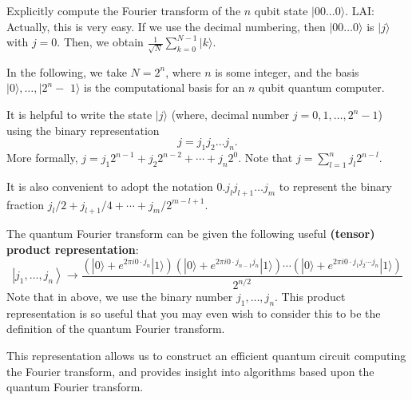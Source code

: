 
\begin{exercise}
    Explicitly compute the Fourier transform of the $n$ qubit state $|00 \ldots 0\rangle$. LAI: Actually, this is very easy. If we use the decimal numbering, then $|00 \ldots 0\rangle$ is $|j\rangle$ with $j=0$. Then, we obtain $\frac{1}{\sqrt{N}} \sum_{k=0}^{N-1}|k\rangle$.
\end{exercise}

In the following, we take $N=2^{n}$, where $n$ is some integer, and the basis $|0\rangle, \ldots, \mid 2^{n}-$ $1\rangle$ is the computational basis for an $n$ qubit quantum computer. 

It is helpful to write the state $|j\rangle$ (where, decimal number $j=0,1,\dots,2^n-1$) using the binary representation 
\begin{equation}
    j=j_{1} j_{2} \ldots j_{n}.
\end{equation}
More formally, $j=j_{1} 2^{n-1}+j_{2} 2^{n-2}+\cdots+j_{n} 2^{0}$. Note that $j=\sum_{l=1}^n j_l 2^{n-l}.$

It is also convenient to adopt the notation $0.j_{l} j_{l+1} \ldots j_{m}$ to represent the  binary fraction $j_{l} / 2+j_{l+1} / 4+\cdots+j_{m} / 2^{m-l+1}.$ 


\begin{theorem}
    The quantum Fourier transform can be given the following useful \textbf{(tensor) product representation}:
\begin{equation}
    \left|j_{1}, \ldots, j_{n}\right\rangle \rightarrow \frac{\left(|0\rangle+e^{2 \pi i 0 \cdot j_{n}}|1\rangle\right)\left(|0\rangle+e^{2 \pi i 0 \cdot j_{n-1} j_{n}}|1\rangle\right) \cdots\left(|0\rangle+e^{2 \pi i 0 \cdot j_{1} j_{2} \cdots j_{n}}|1\rangle\right)}{2^{n / 2}} \tag{5.4}
\end{equation}
Note that in above, we use the binary number $j_{1}, \ldots, j_{n}$. This product representation is so useful that you may even wish to consider this to be the definition of the quantum Fourier transform. 
\end{theorem}

This representation allows us to construct an efficient quantum circuit computing the Fourier transform, and provides insight into algorithms based upon the quantum Fourier transform.

